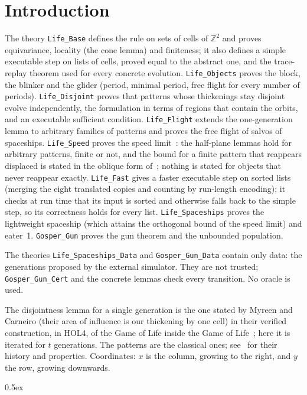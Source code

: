 \documentclass[10pt,a4paper]{article}
\begin{document}
\tableofcontents

\section*{Introduction}

The theory \texttt{Life\_Base} defines the rule on sets of cells of $\mathbb{Z}^2$ and proves equivariance,
locality (the cone lemma) and finiteness; it also defines a simple executable step on lists of cells, proved
equal to the abstract one, and the trace-replay theorem used for every concrete evolution.
\texttt{Life\_Objects} proves the block, the blinker and the glider (period, minimal period, free flight for every
number of periods). \texttt{Life\_Disjoint} proves that patterns whose thickenings stay disjoint evolve
independently, the formulation in terms of regions that contain the orbits, and an executable sufficient
condition. \texttt{Life\_Flight} extends the one-generation lemma to arbitrary families of patterns and proves the
free flight of salvos of spaceships. \texttt{Life\_Speed} proves the speed limit~\cite[Theorem~4.1]{JG22}: the
half-plane lemmas hold for arbitrary patterns, finite or not, and the bound for a finite pattern that reappears
displaced is stated in the oblique form of~\cite[Exercise~4.26]{JG22}; nothing is stated for objects that never
reappear exactly. \texttt{Life\_Fast} gives a faster executable step on sorted lists (merging the eight translated copies
and counting by run-length encoding); it checks at run time that its input is sorted and otherwise falls back to the
simple step, so its correctness holds for every list. \texttt{Life\_Spaceships} proves the lightweight spaceship (which
attains the orthogonal bound of the speed limit) and eater~1. \texttt{Gosper\_Gun} proves the gun theorem and the unbounded population.

The theories \texttt{Life\_Spaceships\_Data} and \texttt{Gosper\_Gun\_Data} contain only data: the generations
proposed by the external simulator. They are not trusted; \texttt{Gosper\_Gun\_Cert} and the concrete lemmas check
every transition. No oracle is used.

The disjointness lemma for a single generation is the one stated by Myreen and Carneiro (their area of
influence is our thickening by one cell) in their verified construction, in HOL4, of the Game of Life inside the
Game of Life~\cite{MC25}; here it is iterated for $t$ generations. The patterns are the classical
ones; see~\cite{JG22} for their history and properties. Coordinates: $x$ is the column, growing to the right, and
$y$ the row, growing downwards.

\parindent 0pt\parskip 0.5ex





\end{document}
